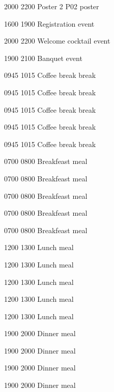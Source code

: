          {2000} {2200} {Poster 2} {} {P02} {poster}
        
         {1600} {1900} {Registration} {} {} {event}
        
         {2000} {2200} {Welcome cocktail} {} {} {event}
        
         {1900} {2100} {Banquet} {} {} {event}
        
         {0945} {1015} {\ft Coffee break} {} {} {break}
        
         {0945} {1015} {\ft Coffee break} {} {} {break}
        
         {0945} {1015} {\ft Coffee break} {} {} {break}
        
         {0945} {1015} {\ft Coffee break} {} {} {break}
        
         {0945} {1015} {\ft Coffee break} {} {} {break}
        
         {0700} {0800} {Breakfeast} {} {} {meal}
        
         {0700} {0800} {Breakfeast} {} {} {meal}
        
         {0700} {0800} {Breakfeast} {} {} {meal}
        
         {0700} {0800} {Breakfeast} {} {} {meal}
        
         {0700} {0800} {Breakfeast} {} {} {meal}
        
         {1200} {1300} {Lunch} {} {} {meal}
        
         {1200} {1300} {Lunch} {} {} {meal}
        
         {1200} {1300} {Lunch} {} {} {meal}
        
         {1200} {1300} {Lunch} {} {} {meal}
        
         {1200} {1300} {Lunch} {} {} {meal}
        
         {1900} {2000} {Dinner} {} {} {meal}
        
         {1900} {2000} {Dinner} {} {} {meal}
        
         {1900} {2000} {Dinner} {} {} {meal}
        
         {1900} {2000} {Dinner} {} {} {meal}
        